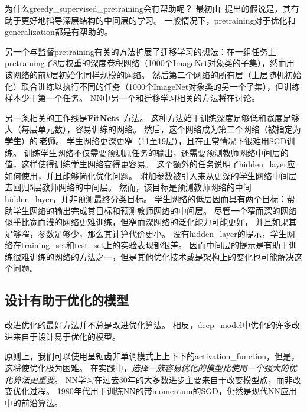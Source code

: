 为什么\gls{greedy_supervised_pretraining}会有帮助呢？
最初由~\cite{Bengio-nips-2006}提出的假说是，其有助于更好地指导深层结构的中间层的学习。
一般情况下，\gls{pretraining}对于优化和\gls{generalization}都是有帮助的。

另一个与监督\gls{pretraining}有关的方法扩展了迁移学习的想法：\cite{yosinski-nips2014}在一组任务上\gls{pretraining}了$8$层权重的深度卷积网络（1000个ImageNet对象类的子集），然而用该网络的前$k$层初始化同样规模的网络。
然后第二个网络的所有层（上层随机初始化）联合训练以执行不同的任务（1000个ImageNet对象类的另一个子集），但训练样本少于第一个任务。
\gls{NN}中另一个和迁移学习相关的方法将在讨论。

另一条相关的工作线是\textbf{FitNets}~\citep{Romero-et-al-ICLR2015-small}方法。
这种方法始于训练深度足够低和宽度足够大（每层单元数），容易训练的网络。
然后，这个网络成为第二个网络（被指定为\,\textbf{学生}）的\,\textbf{老师}。
学生网络更深更窄（11至19层），且在正常情况下很难用SGD训练。
训练学生网络不仅需要预测原任务的输出，还需要预测教师网络中间层的值，这样使得训练学生网络变得更容易。
这个额外的任务说明了\gls{hidden_layer}应如何使用，并且能够简化优化问题。
附加参数被引入来从更深的学生网络中间层去回归$5$层教师网络的中间层。
然而，该目标是预测教师网络的中间\gls{hidden_layer}，并非预测最终分类目标。
学生网络的低层因而具有两个目标：帮助学生网络的输出完成其目标和预测教师网络的中间层。
尽管一个窄而深的网络似乎比宽而浅的网络更难训练，但窄而深网络的泛化能力可能更好，
并且如果其足够窄，参数足够少，那么其计算代价更小。
没有\gls{hidden_layer}的提示，学生网络在\gls{training_set}和\gls{test_set}上的实验表现都很差。
因而中间层的提示是有助于训练很难训练的网络的方法之一，但是其他优化技术或是架构上的变化也可能解决这个问题。


\subsection{设计有助于优化的模型}
\label{sec:designing_models_to_aid_optimization}
改进优化的最好方法并不总是改进优化算法。
相反，\gls{deep_model}中优化的许多改进来自于设计易于优化的模型。

原则上，我们可以使用呈锯齿非单调模式上上下下的\gls{activation_function}，但是，这将使优化极为困难。
在实践中，\emph{选择一族容易优化的模型比使用一个强大的优化算法更重要}。
\gls{NN}学习在过去30年的大多数进步主要来自于改变模型族，而非改变优化过程。
1980年代用于训练\gls{NN}的带\gls{momentum}的\gls{SGD}，仍然是现代\gls{NN}应用中的前沿算法。


